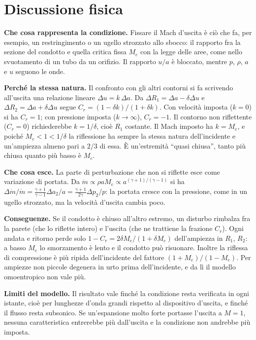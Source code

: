\documentclass[11pt,a4paper]{article}
\newcommand{\Ru}{R_1}
\newcommand{\Rd}{R_2}
\newcommand{\Me}{M_e}
\newcommand{\Cr}{C_r}
\begin{document}
\section{Discussione fisica}
\textbf{Che cosa rappresenta la condizione.} Fissare il Mach d'uscita è ciò che fa, per esempio, un restringimento
o un ugello strozzato allo sbocco: il rapporto fra la sezione del condotto e quella critica fissa $\Me$ con la
legge delle aree, come nello svuotamento di un tubo da un orifizio. Il rapporto $u/a$ è bloccato, mentre $p$, $\rho$,
$a$ e $u$ seguono le onde.

\textbf{Perché la stessa natura.} Il confronto con gli altri contorni si fa scrivendo all'uscita una relazione
lineare $\Delta u=k\,\Delta a$. Da $\Delta\Ru=\Delta a-\delta\Delta u$ e $\Delta\Rd=\Delta a+\delta\Delta u$ segue
$\Cr=(1-\delta k)/(1+\delta k)$. Con velocità imposta ($k=0$) si ha $\Cr=1$; con pressione imposta
($k\to\infty$), $\Cr=-1$. Il contorno non riflettente ($\Cr=0$) richiederebbe $k=1/\delta$, cioè $\Ru$ costante. Il Mach
imposto ha $k=\Me$, e poiché $\Me<1<1/\delta$ la riflessione ha sempre la stessa natura dell'incidente e un'ampiezza
almeno pari a $2/3$ di essa. È un'estremità ``quasi chiusa'', tanto più chiusa quanto più basso è $\Me$.

\textbf{Che cosa esce.} La parte di perturbazione che non si riflette esce come variazione di portata. Da
$\dot m\propto\rho a\Me\propto a^{(\gamma+1)/(\gamma-1)}$ si ha
$\Delta\dot m/\dot m=\frac{\gamma+1}{\gamma-1}\Delta a_2/a=\frac{\gamma+1}{2\gamma}\Delta p_2/p$: la portata cresce con
la pressione, come in un ugello strozzato, ma la velocità d'uscita cambia poco.

\textbf{Conseguenze.} Se il condotto è chiuso all'altro estremo, un disturbo rimbalza fra la parete (che lo
riflette intero) e l'uscita (che ne trattiene la frazione $\Cr$). Ogni andata e ritorno perde solo
$1-\Cr=2\delta\Me/(1+\delta\Me)$ dell'ampiezza in $\Ru$, $\Rd$: a basso $\Me$ lo smorzamento è lento e il condotto
può risuonare. Inoltre la riflessa di compressione è più ripida dell'incidente del fattore $(1+\Me)/(1-\Me)$. Per
ampiezze non piccole degenera in urto prima dell'incidente, e da lì il modello omoentropico non vale più.

\textbf{Limiti del modello.} Il risultato vale finché la condizione resta verificata in ogni istante, cioè per
lunghezze d'onda grandi rispetto al dispositivo d'uscita, e finché il flusso resta subsonico. Se un'espansione
molto forte portasse l'uscita a $M=1$, nessuna caratteristica entrerebbe più dall'uscita e la condizione non
andrebbe più imposta.
\end{document}
